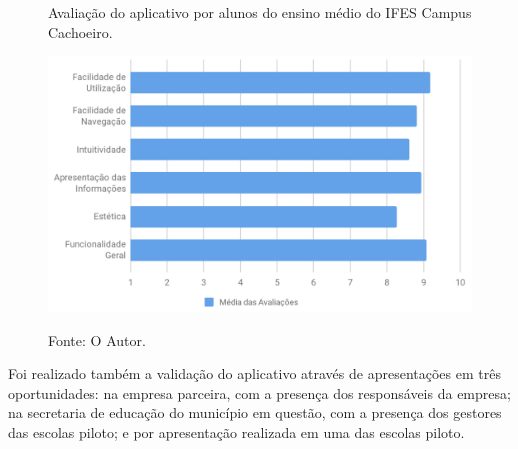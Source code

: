 \begin{figure}[H]
	\caption{Avaliação do aplicativo por alunos do ensino médio do IFES Campus Cachoeiro.}
	\centering %
	\includegraphics[width=15cm]{resources/pesquisa_avaliacao.png} %
	\label{figura:avaliacao}
	\captionsetup{singlelinecheck = false, format= hang, justification=raggedright, labelsep=space, width=15cm}
	\caption*{\footnotesize Fonte: O Autor.}
\end{figure}

Foi realizado também a validação do aplicativo através de apresentações em três oportunidades: na empresa parceira, com a presença dos responsáveis da empresa; na secretaria de educação do município em questão, com a presença dos gestores das escolas piloto; e por apresentação realizada em uma das escolas piloto.